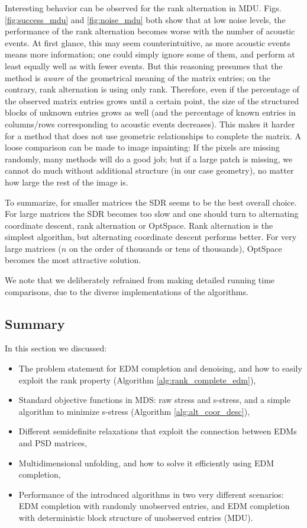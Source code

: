 \documentclass[10pt,double]{IEEEtran}
\begin{document}
{Interesting behavior can be observed for the rank alternation in MDU. Figs.
\ref{fig:success_mdu} and \ref{fig:noise_mdu} both show that at low noise
levels, the performance of the rank alternation becomes worse with the number
of acoustic events. At first glance, this may seem counterintuitive, as more
acoustic events means more information; one could simply ignore some of them,
and perform at least equally well as with fewer events. But this reasoning
presumes that the method is \emph{aware} of the geometrical meaning of the
matrix entries; on the contrary, rank alternation is using only rank.
Therefore, even if the percentage of the observed matrix entries grows until a
certain point, the size of the structured blocks of unknown entries grows as
well (and the percentage of known entries in columns/rows corresponding to
acoustic events decreases). This makes it harder for a method that does not
use geometric relationships to complete the matrix. A loose comparison can be
made to image inpainting: If the pixels are missing randomly, many methods
will do a good job; but if a large patch is missing, we cannot do much without
additional structure (in our case geometry), no matter how large the rest of
the image is.

To summarize, for smaller matrices the SDR seems to be the best overall
choice. For large matrices the SDR becomes too slow and one should turn to
alternating coordinate descent, rank alternation or OptSpace. Rank alternation
is the simplest algorithm, but alternating coordinate descent performs better.
For very large matrices ($n$ on the order of thousands or tens of thousands),
OptSpace becomes the most attractive solution.} We note that we deliberately
refrained from making detailed running time comparisons, due to the diverse
implementations of the algorithms.





\subsection{Summary} 

In this section we discussed:
\begin{itemize}
	\item The problem statement for EDM completion and denoising, and how to
	easily exploit the rank property (Algorithm
	\ref{alg:rank_complete_edm}),
	\item Standard objective functions in MDS: raw stress and s-stress, and
	 a simple algorithm to minimize s-stress (Algorithm
	\ref{alg:alt_coor_desc}),
	\item Different semidefinite relaxations that exploit the connection
	between EDMs and PSD matrices,
	\item Multidimensional unfolding, and how to solve it efficiently using
	EDM completion,
  \item Performance of the introduced algorithms in two very different
  scenarios: EDM completion with randomly unobserved entries, and EDM
  completion with deterministic block structure of unobserved entries (MDU).
\end{itemize}
\end{document}
